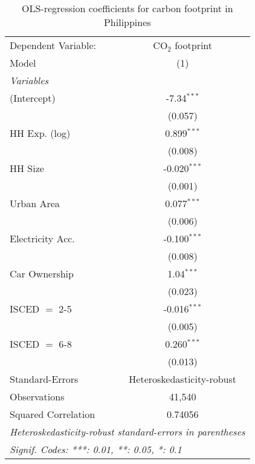 
\begin{table}[htbp!]
   \centering
   \small
   \begin{adjustbox}{width = 1\textwidth, max height = 0.95\textheight, center}
      \begin{threeparttable}[b]
         \caption{\label{tab:OLS_2_PHL} OLS-regression coefficients for carbon footprint in Philippines}
         \begin{tabular}{lc}
            \tabularnewline \midrule \midrule
            Dependent Variable: & CO$_{2}$ footprint\\  
            Model               & (1)\\  
            \midrule
            \emph{Variables}\\
            (Intercept)         & -7.34$^{***}$\\   
                                & (0.057)\\   
            HH Exp. (log)       & 0.899$^{***}$\\   
                                & (0.008)\\   
            HH Size             & -0.020$^{***}$\\   
                                & (0.001)\\   
            Urban Area          & 0.077$^{***}$\\   
                                & (0.006)\\   
            Electricity Acc.    & -0.100$^{***}$\\   
                                & (0.008)\\   
            Car Ownership       & 1.04$^{***}$\\   
                                & (0.023)\\   
            ISCED $=$ 2-5       & -0.016$^{***}$\\   
                                & (0.005)\\   
            ISCED $=$ 6-8       & 0.260$^{***}$\\   
                                & (0.013)\\   
            \midrule 
            Standard-Errors     & Heteroskedasticity-robust \\   
            Observations        & 41,540\\  
            Squared Correlation & 0.74056\\  
            \midrule \midrule
            \multicolumn{2}{l}{\emph{Heteroskedasticity-robust standard-errors in parentheses}}\\
            \multicolumn{2}{l}{\emph{Signif. Codes: ***: 0.01, **: 0.05, *: 0.1}}\\
         \end{tabular}
         

\end{threeparttable}
\end{adjustbox}
\end{table}
